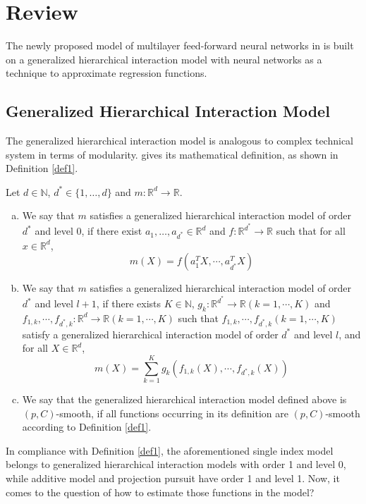 \section{Review}
\label{sec:review}

The newly proposed model of multilayer feed-forward neural networks in \cite{Bauer2019} is built on a generalized hierarchical interaction model with neural networks as a technique to approximate regression functions. 

\subsection{Generalized Hierarchical Interaction Model}

The generalized hierarchical interaction model is analogous to complex technical system in terms of modularity. \cite{Kohler2017} gives its mathematical definition, as shown in Definition \ref{def1}.

\begin{definition}
Let $d \in \mathbb{N}$, $d^* \in \{1,\ldots,d\}$ and $m:\mathbb{R}^d \rightarrow \mathbb{R}$.
\begin{enumerate}[(a)]
    \item We say that $m$ satisfies a generalized hierarchical interaction model of order $d^*$ and level 0, if there exist $a_1,\ldots,a_{d^*} \in \mathbb{R}^d$ and $f:\mathbb{R}^{d^*}\rightarrow \mathbb{R}$ such that for all $x \in \mathbb{R}^d$, 
    \[ m(X)=f(a_1^TX,\cdots,a_{d^*}^TX) \]
    \item We say that $m$ satisfies a generalized hierarchical interaction model of order $d^*$ and level $l+1$, if there exists $K\in \mathbb{N}$, $g_k:\mathbb{R}^{d^*} \rightarrow \mathbb{R}(k=1,\cdots,K)$ and $f_{1,k},\cdots,f_{d^*,k}: \mathbb{R}^d \rightarrow \mathbb{R} (k=1,\cdots,K)$ such that $f_{1,k},\cdots,f_{d^*,k} (k=1,\cdots,K)$ satisfy a generalized hierarchical interaction model of order $d^*$ and level $l$, and for all $X \in \mathbb{R}^d$,
    \[ m(X)=\sum_{k=1}^{K}g_k(f_{1,k}(X),\cdots,f_{d^*,k}(X))\]
    \item We say that the generalized hierarchical interaction model defined above is $(p,C)$-smooth, if all functions occurring in its definition are $(p,C)$-smooth according to Definition \ref{def1}.
\end{enumerate}
\label{def1}
\end{definition}

In compliance with Definition \ref{def1}, the aforementioned single index model belongs to generalized hierarchical interaction models with order 1 and level 0, while additive model and projection pursuit have order 1 and level 1. Now, it comes to the question of how to estimate those functions in the model?


